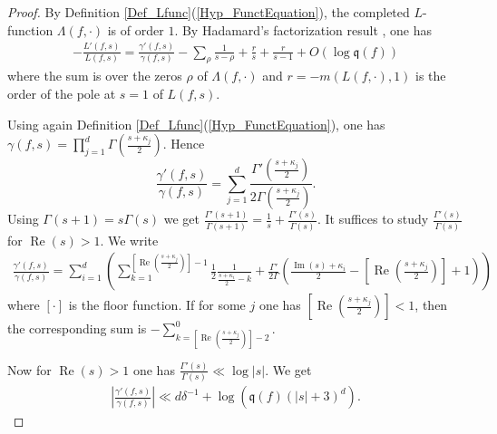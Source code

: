 \documentclass[a4paper,10pt]{amsart}
\theoremstyle{plain}
\theoremstyle{definition}
\begin{document}
\begin{proof}
By Definition \ref{Def_Lfunc}(\ref{Hyp_FunctEquation}), 
the completed $L$-function $\Lambda(f,\cdot)$ is of order $1$.
By Hadamard's factorization result \cite[Th. 5.6]{IK}, one has
\begin{align*}
-\frac{L'(f,s)}{L(f,s)} = \frac{\gamma'(f,s)}{\gamma(f,s)} -
\sum_{\rho}\frac{1}{s-\rho} + \frac{r}{s} + \frac{r}{s-1} + O(\log \mathfrak{q}(f))
\end{align*}
where the sum is over the zeros $\rho$ of $\Lambda(f,\cdot)$ 
and $r= - m(L(f,\cdot),1)$ is the order of the pole at $s=1$ of $L(f,s)$.

Using again Definition \ref{Def_Lfunc}(\ref{Hyp_FunctEquation}),
one has $\gamma(f,s)=\prod_{j=1}^{d}\Gamma(\frac{s+\kappa_{j}}{2})$.
Hence
$$\frac{\gamma'(f,s)}{\gamma(f,s)}= \sum_{j=1}^{d}\frac{\Gamma'(\frac{s+\kappa_{j}}{2})}{2\Gamma(\frac{s+\kappa_{j}}{2})}.$$
Using $\Gamma(s+1)=s\Gamma(s)$ 
we get $\frac{\Gamma'(s+1)}{\Gamma(s+1)} = \frac{1}{s} + \frac{\Gamma'(s)}{\Gamma(s)}$.
It suffices to study $\frac{\Gamma'(s)}{\Gamma(s)}$ for $\operatorname{Re}(s)>1$.
We write
\begin{align*}
\frac{\gamma'(f,s)}{\gamma(f,s)} = 
\sum_{i=1}^{d}\left( \sum_{k=1}^{\left[\operatorname{Re}\left(\frac{s+\kappa_{j}}{2}\right)\right] -1}\frac{1}{2}\frac{1}{\frac{s+\kappa_{i}}{2}-k}
+ \frac{\Gamma'}{2\Gamma}\left(\frac{\operatorname{Im}(s)+\kappa_{i}}{2} - \left[\operatorname{Re}\left(\frac{s+\kappa_{j}}{2}\right)\right] + 1\right)\right) 
\end{align*}
where $\left[\cdot\right]$ is the floor function. If for some $j$ one has $\left[\operatorname{Re}\left(\frac{s+\kappa_{j}}{2}\right)\right]<1$, 
then the corresponding sum is
$-\sum_{k=\left[\operatorname{Re}\left(\frac{s+\kappa_{j}}{2}\right)\right] -2}^{0}$.

Now for $\operatorname{Re}(s)>1$ one has $\frac{\Gamma'(s)}{\Gamma(s)}\ll \log\lvert s\rvert$.
We get 
\begin{align*}
\left\lvert \frac{\gamma'(f,s)}{\gamma(f,s)}\right\rvert \ll d\delta^{-1} + \log\left( \mathfrak{q}(f)(\lvert s\rvert +3)^{d}\right).
\end{align*}


\end{proof}
\end{document}
